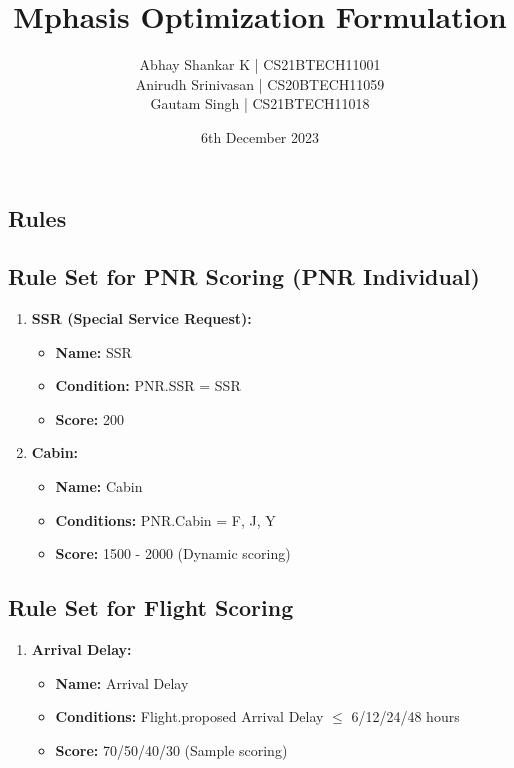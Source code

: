 \documentclass{article}
\title{\textbf{Mphasis Optimization Formulation}}
\author{
Abhay Shankar K | CS21BTECH11001 \\
Anirudh Srinivasan | CS20BTECH11059 \\
Gautam Singh | CS21BTECH11018
}
\date{6th December 2023}
\begin{document}
\maketitle
\newpage


\begin{flushleft}
\section{\textbf{Rules}}
\subsection{Rule Set for PNR Scoring (PNR Individual)}
\begin{enumerate}
    \item \textbf{SSR (Special Service Request):}
    \begin{itemize}
        \item \textbf{Name:} SSR
        \item \textbf{Condition:} PNR.SSR = SSR
        \item \textbf{Score:} 200
    \end{itemize}
    
    \item \textbf{Cabin:}
    \begin{itemize}
        \item \textbf{Name:} Cabin
        \item \textbf{Conditions:} PNR.Cabin = F, J, Y
        \item \textbf{Score:} 1500 - 2000 (Dynamic scoring)
    \end{itemize}

\end{enumerate}

\subsection{Rule Set for Flight Scoring}
\begin{enumerate}
    \item \textbf{Arrival Delay:}
    \begin{itemize}
        \item \textbf{Name:} Arrival Delay
        \item \textbf{Conditions:} Flight.proposed Arrival Delay $\leq$ 6/12/24/48 hours
        \item \textbf{Score:} 70/50/40/30 (Sample scoring)
    \end{itemize}


\end{enumerate}
\end{flushleft}
\end{document}

